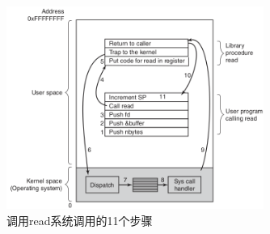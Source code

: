 	\begin{figure}[ht]\small
		\centering
		\includegraphics[width=0.75\textwidth]{FIG/1-17.png}
		\caption{调用read系统调用的11个步骤}\label{fig:read11steps}
	\end{figure}
	
